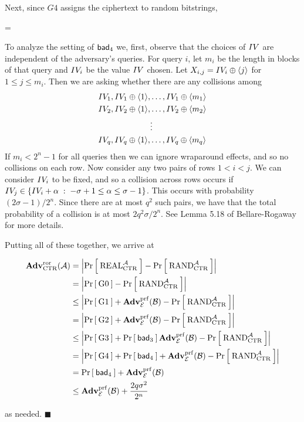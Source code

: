 Next, since $G4$ assigns the ciphertext to random bitstrings,

\bnm
{} = 
\enm

To analyze the setting of $\mathsf{bad}_4$ we, first, observe that the choices of $IV$
are independent of the adversary's queries. For query $i$, let $m_i$ be the
length in blocks of that query and $IV_i$ be the value $IV$ chosen.
Let $X_{i,j} = IV_i \oplus \langle j\rangle$ for $1 \le j \le m_i$. Then we are
asking whether there are any collisions among 
\begin{align*}
    &\IV_1 , \IV_1 \oplus \langle 1\rangle, \ldots , \IV_1 \oplus \langle m_1\rangle \\
    &\IV_2 , \IV_2 \oplus \langle 1\rangle, \ldots , \IV_2 \oplus \langle m_2\rangle \\
    &\phantom{\IV_2 , \IV_2 \oplus \langle 1\rangle, } \vdots\\
    &\IV_q , \IV_q \oplus \langle 1\rangle, \ldots , \IV_q \oplus \langle m_q\rangle \\
\end{align*}
If $m_i < 2^n-1$ for all queries then we can ignore wraparound effects, and so
no collisions on each row. Now consider any two pairs of rows $1 < i < j$. We
can consider $IV_i$ to be fixed, and so a collision across rows occurs if
$IV_j \in \{IV_i + \alpha \;:\; -\sigma +1 \le \alpha \le \sigma-1\}$. This
occurs with probability $(2\sigma-1) / 2^n$. Since there are at most $q^2$ such
pairs, we have that the total probability of a collision is at most 
$2q^2\sigma / 2^n$. See Lemma 5.18 of Bellare-Rogaway for more details.

Putting all of these together, we arrive at

\begin{align*}
  \mathbf{Adv}^{\mathrm{ror}}_{\textnormal{CTR}}({\mathcal A}) 
    &= \left| \Pr\left[\: \textnormal{REAL}_{\textnormal{CTR}}^{\mathcal A} \:\right] - \Pr\left[\: \textnormal{RAND}_{\textnormal{CTR}}^{\mathcal A} \:\right]\right|\\
    &= \left| \Pr\left[\: {{\textnormal G}}0 \:\right] - \Pr\left[\: \textnormal{RAND}_{\textnormal{CTR}}^{\mathcal A} \:\right]\right|\\
    &\le \left| \Pr\left[\: {{\textnormal G}}1 \:\right] + \mathbf{Adv}^{\mathrm{prf}}_{{\cal E}}({\mathcal B}) - \Pr\left[\: \textnormal{RAND}_{\textnormal{CTR}}^{\mathcal A} \:\right]\right|\\
    &= \left| \Pr\left[\: {{\textnormal G}}2 \:\right] + \mathbf{Adv}^{\mathrm{prf}}_{{\cal E}}({\mathcal B}) - \Pr\left[\: \textnormal{RAND}_{\textnormal{CTR}}^{\mathcal A} \:\right]\right|\\
    &\le \left| \Pr\left[\: {{\textnormal G}}3 \:\right] + \Pr\left[\: \mathsf{bad}_3 \:\right] \mathbf{Adv}^{\mathrm{prf}}_{{\cal E}}({\mathcal B}) - \Pr\left[\: \textnormal{RAND}_{\textnormal{CTR}}^{\mathcal A} \:\right]\right|\\
    &= \left| \Pr\left[\: {{\textnormal G}}4 \:\right] + \Pr\left[\: \mathsf{bad}_4 \:\right] + \mathbf{Adv}^{\mathrm{prf}}_{{\cal E}}({\mathcal B}) - \Pr\left[\: \textnormal{RAND}_{\textnormal{CTR}}^{\mathcal A} \:\right]\right|\\
    &= \Pr\left[\: \mathsf{bad}_4 \:\right] + \mathbf{Adv}^{\mathrm{prf}}_{{\cal E}}({\mathcal B})\\
    &\le \mathbf{Adv}^{\mathrm{prf}}_{{\cal E}}({\mathcal B}) + \frac{2q\sigma^2}{2^n}
\end{align*}

as needed. $\blacksquare$



